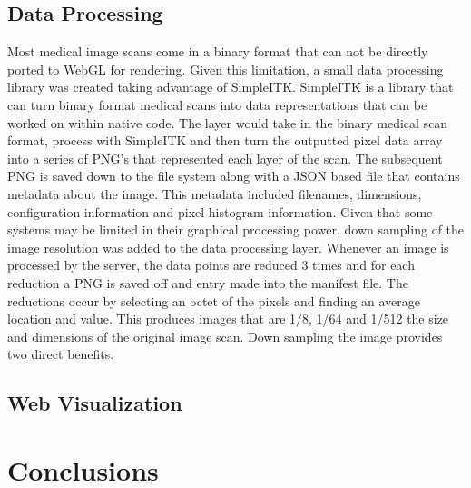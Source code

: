 \documentclass{acm_proc_article-sp}
\begin{document}
\subsection{Data Processing}
Most medical image scans come in a binary format that can not be directly ported to WebGL for rendering.  Given this limitation, a small data processing library was created taking advantage of SimpleITK.  SimpleITK is a library that can turn binary format medical scans into data representations that can be worked on within native code.  The layer would take in the binary medical scan format, process with SimpleITK and then turn the outputted pixel data array into a series of PNG's that represented each layer of the scan.  The subsequent PNG is saved down to the file system along with a JSON based file that contains metadata about the image.  This metadata included filenames, dimensions, configuration information and pixel histogram information.
        Given that some systems may be limited in their graphical processing power, down sampling of the image resolution was added to the data processing layer.  Whenever an image is processed by the server, the data points are reduced 3 times and for each reduction a PNG is saved off and entry made into the manifest file.  The reductions occur by selecting an octet of the pixels and finding an average location and value.  This produces images that are 1/8, 1/64 and 1/512 the size and dimensions of the original image scan.
        Down sampling the image provides two direct benefits.


\subsection{Web Visualization}

\section{Conclusions}

%

%
%
\appendix
\section{}


\balancecolumns
\end{document}
